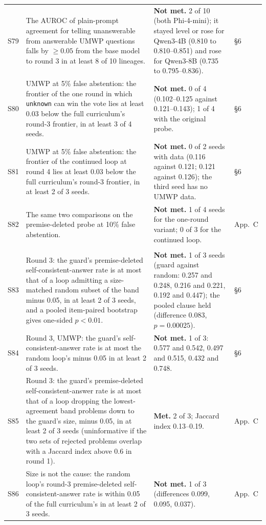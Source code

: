 \documentclass[10pt,a4paper]{article}
\makeatletter
\newcommand{\unk}{\texttt{unknown}}
\newcommand{\met}{\textbf{Met.}}
\newcommand{\nmet}{\textbf{Not met.}}
\newcommand{\sub}[1]{\multicolumn{4}{@{}l}{\emph{#1}}\\\addlinespace[1pt]}
\makeatother
\begin{document}
\begin{longtable}{@{}L{0.9cm}L{7.8cm}L{6.1cm}L{1.3cm}@{}}
S79 & The AUROC of plain-prompt agreement for telling unanswerable from answerable UMWP questions falls by $\ge 0.05$ from the base model to round 3 in at least 8 of 10 lineages. & \nmet{} 2 of 10 (both Phi-4-mini); it stayed level or rose for Qwen3-4B (0.810 to 0.810--0.851) and rose for Qwen3-8B (0.735 to 0.795--0.836). & \S6 \\
S80 & UMWP at 5\% false abstention: the frontier of the one round in which \unk{} can win the vote lies at least 0.03 below the full curriculum's round-3 frontier, in at least 3 of 4 seeds. & \nmet{} 0 of 4 (0.102--0.125 against 0.121--0.143); 1 of 4 with the original probe. & \S6 \\
S81 & UMWP at 5\% false abstention: the frontier of the continued loop at round 4 lies at least 0.03 below the full curriculum's round-3 frontier, in at least 2 of 3 seeds. & \nmet{} 0 of 2 seeds with data (0.116 against 0.121; 0.121 against 0.126); the third seed has no UMWP data. & \S6 \\
S82 & The same two comparisons on the premise-deleted probe at 10\% false abstention. & \nmet{} 1 of 4 seeds for the one-round variant; 0 of 3 for the continued loop. & App.~C \\
\addlinespace[2pt]
\sub{Size- and difficulty-matched loops}
S83 & Round 3: the guard's premise-deleted self-consistent-answer rate is at most that of a loop admitting a size-matched random subset of the band minus 0.05, in at least 2 of 3 seeds, and a pooled item-paired bootstrap gives one-sided $p < 0.01$. & \nmet{} 1 of 3 seeds (guard against random: 0.257 and 0.248, 0.216 and 0.221, 0.192 and 0.447); the pooled clause held (difference 0.083, $p = 0.00025$). & \S6 \\
S84 & Round 3, UMWP: the guard's self-consistent-answer rate is at most the random loop's minus 0.05 in at least 2 of 3 seeds. & \nmet{} 1 of 3: 0.577 and 0.542, 0.497 and 0.515, 0.432 and 0.748. & \S6 \\
S85 & Round 3: the guard's premise-deleted self-consistent-answer rate is at most that of a loop dropping the lowest-agreement band problems down to the guard's size, minus 0.05, in at least 2 of 3 seeds (uninformative if the two sets of rejected problems overlap with a Jaccard index above 0.6 in round 1). & \met{} 2 of 3; Jaccard index 0.13--0.19. & App.~C \\
S86 & Size is not the cause: the random loop's round-3 premise-deleted self-consistent-answer rate is within 0.05 of the full curriculum's in at least 2 of 3 seeds. & \nmet{} 1 of 3 (differences 0.099, 0.095, 0.037). & App.~C \\

\end{longtable}
\end{document}
